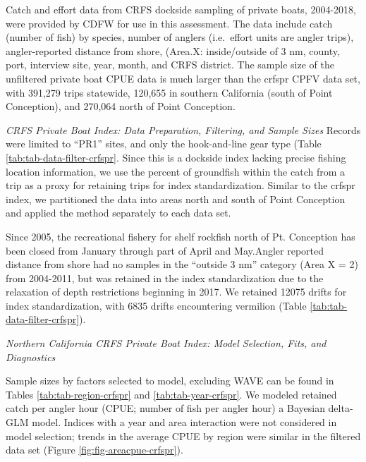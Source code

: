\documentclass[11pt,
  english,
  a4paper,
]{article}
\begin{document}
\leavevmode\tagmcend\tagstructend

Catch and effort data from CRFS dockside sampling of private boats, 2004-2018, were provided by CDFW for use in this assessment. The data include catch (number of fish) by species, number of anglers (i.e.~effort units are angler trips), angler-reported distance from shore, (Area.X: inside/outside of 3 nm, county, port, interview site, year, month, and CRFS district. The sample size of the unfiltered private boat CPUE data is much larger than the crfspr CPFV data set, with 391,279 trips statewide, 120,655 in southern California (south of Point Conception), and 270,064 north of Point Conception.

\emph{CRFS Private Boat Index: Data Preparation, Filtering, and Sample Sizes} Records were limited to ``PR1'' sites, and only the hook-and-line gear type (Table \ref{tab:tab-data-filter-crfspr}. Since this is a dockside index lacking precise fishing location information, we use the percent of groundfish within the catch from a trip as a proxy for retaining trips for index standardization. Similar to the crfspr index, we partitioned the data into areas north and south of Point Conception and applied the method separately to each data set.

Since 2005, the recreational fishery for shelf rockfish north of Pt. Conception has been closed from January through part of April and May.Angler reported distance from shore had no samples in the ``outside 3 nm'' category (Area X = 2) from 2004-2011, but was retained in the index standardization due to the relaxation of depth restrictions beginning in 2017. We retained 12075 drifts for index standardization, with 6835 drifts encountering vermilion (Table \ref{tab:tab-data-filter-crfspr}).

\emph{Northern California CRFS Private Boat Index: Model Selection, Fits, and Diagnostics}

Sample sizes by factors selected to model, excluding WAVE can be found in Tables \ref{tab:tab-region-crfspr} and \ref{tab:tab-year-crfspr}. We modeled retained catch per angler hour (CPUE; number of fish per angler hour) a Bayesian delta-GLM model. Indices with a year and area interaction were not considered in model selection; trends in the average CPUE by region were similar in the filtered data set (Figure \ref{fig:fig-areacpue-crfspr}).
\end{document}
